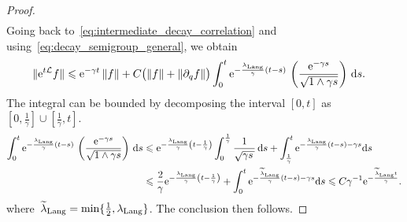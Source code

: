\documentclass[11pt,a4paper]{article}
\newcommand{\e}{\mathrm{e}}
\renewcommand{\d}{\mathrm d}
\theoremstyle{plain}
\numberwithin{equation}{section}
\renewcommand{\leq}{\leqslant}
\renewcommand{\geq}{\geqslant}
\begin{document}
\begin{proof}
\begin{align}
    \end{align}
    Going back to~\eqref{eq:intermediate_decay_correlation} and using~\eqref{eq:decay_semigroup_general},
    we obtain
    \begin{align*}
        \norm*{ \e^{t \mathcal L} f}
        &\leq  \e^{-\gamma t} \norm{f}
        + C  \bigl( \norm{f} + \norm{\partial_q f}\bigr) \int_{0}^{t} \e^{-\frac{\lambda_{\rm Lang}}{\gamma}(t-s)}  \, \left(\frac{\e^{-\gamma s}}{\sqrt{1 \wedge \gamma s}}\right) \, \d s.
    \end{align*}
    The integral can be bounded by decomposing the interval $[0, t]$ as $[0, \frac{1}{\gamma}] \cup [\frac{1}{\gamma}, t]$.
    \begin{align}
        \notag
        \int_{0}^{t} \e^{-\frac{\lambda_{\rm Lang}}{\gamma}(t-s)}  \, \left( \frac{\e^{-\gamma s}}{\sqrt{1 \wedge \gamma s}} \right) \, \d s
        & \leq
        \e^{-\frac{\lambda_{\rm Lang}}{\gamma} \left(t-\frac{1}{\gamma}\right)}
         \int_{0}^{\frac{1}{\gamma}}  \frac{1}{\sqrt{\gamma s\, }} \, \d s
         + \int_{\frac{1}{\gamma}}^{t} \e^{-\frac{\lambda_{\rm Lang}}{\gamma}(t-s) - \gamma s} \d s \\
         \notag
        & \leq
        \frac{2}{\gamma}\e^{-\frac{\lambda_{\rm Lang}}{\gamma} \left(t-\frac{1}{\gamma}\right)}
         + \int_{0}^{t} \e^{-\frac{\widetilde \lambda_{\rm Lang}}{\gamma}(t-s) - \gamma s} \d s
        \leq C  \gamma^{-1} \e^{-\frac{\widetilde \lambda_{\rm Lang} t}{\gamma}}.
    \end{align}
    where~$\widetilde \lambda_{\rm Lang} = \min \{\frac{1}{2}, \lambda_{\rm Lang} \}$.
    The conclusion then follows.
\end{proof}
\end{document}
